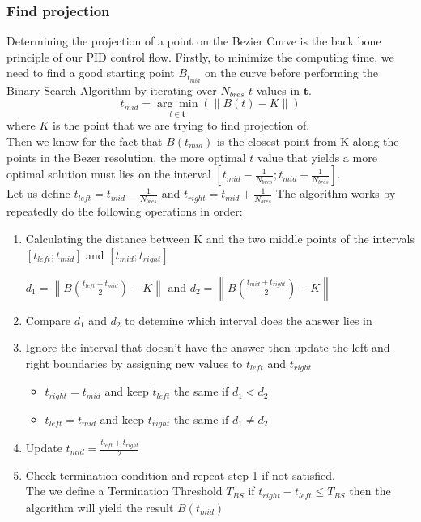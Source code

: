     \subsubsection*{Find projection}
    Determining the projection of a point on the Bezier Curve is the back bone principle of our PID control flow.
    Firstly, to minimize the computing time, we need to find a good starting point $B_{t_{mid}}$ on the curve before performing the Binary Search Algorithm by iterating over $N_{bres}$ $t$ values in $\mathbf{t}$.
    $$t_{mid} = \underset{t\in\mathbf{t}}{\arg\min}\left(\left\lVert B(t) - K\right\rVert\right)$$
    where $K$ is the point that we are trying to find projection of.
    \\
    Then we know for the fact that $B(t_{mid})$ is the closest point from K along the points in the Bezer resolution, the more optimal $t$ value that yields a more optimal solution must lies on the interval $\left[t_{mid}-\frac{1}{N_{bres}}; t_{mid}+\frac{1}{N_{bres}}\right]$.
    \\
    Let us define $t_{left} = t_{mid} - \frac{1}{N_{bres}}$ and $t_{right}=t_{mid}+\frac{1}{N_{bres}}$
    The algorithm works by repeatedly do the following operations in order:
    \begin{enumerate}
      \item Calculating the distance between K and the two middle points of the intervals $[t_{left};t_{mid}]$ and $[t_{mid};t_{right}]$
        \begin{center}
          $d_1 = \left\lVert B\left(\frac{t_{left}+t_{mid}}{2}\right)-K \right\rVert$ and 
          $d_2 = \left\lVert B\left(\frac{t_{mid}+t_{right}}{2}\right)-K \right\rVert$ 
        \end{center}
      \item Compare $d_1$ and $d_2$ to detemine which interval does the answer lies in
      \item Ignore the interval that doesn't have the answer then update the left and right boundaries by assigning new values to $t_{left}$ and $t_{right}$
        \begin{itemize}
          \item $t_{right} = t_{mid}$ and keep $t_{left}$ the same if $d_1<d_2$
          \item $t_{left} = t_{mid}$ and keep $t_{right}$ the same if $d_1\neq d_2$
        \end{itemize}
      \item Update $t_{mid} = \frac{t_{left} + t_{right}}{2}$
      \item Check termination condition and repeat step 1 if not satisfied.\\
        The we define a Termination Threshold $T_{BS}$ if $t_{right}-t_{left} \leq T_{BS}$ then the algorithm will yield the result $B(t_{mid})$
    \end{enumerate}
    
